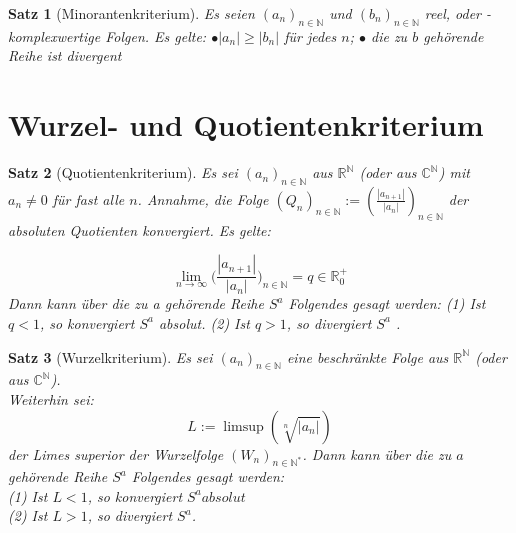 \documentclass[a4paper,12pt]{article}
\newtheorem{theorem}{Satz}[section]
\begin{document}
\begin{theorem}[Minorantenkriterium]
 
Es seien $(a_n)_{n \in \mathbb{N}}$ und $(b_n)_{n \in \mathbb{N}}$ reel, oder -komplexwertige Folgen. Es gelte:
\newline
$\bullet |a_n| \geq |b_n|$ für jedes $n$;
\newline
$\bullet$ die zu $b$ gehörende Reihe ist divergent
 
\end{theorem}
\newpage
\section{Wurzel- und Quotientenkriterium}
\begin{theorem}[Quotientenkriterium]
Es sei $(a_n)_{n \in \mathbb{N}}$ aus $\mathbb{R}^{\mathbb{N}}$ (oder aus $\mathbb{C}^{\mathbb{N}}$) mit $a_n \neq 0$ für fast alle $n$. Annahme, die Folge
$(Q_n)_{n \in \mathbb{N}} := (\frac{|a_{n+1}|}{|a_n|})_{n \in \mathbb{N}}$
der absoluten Quotienten konvergiert. Es gelte:

$$
\lim_{n \to \infty}\bigg(\frac{|a_{n+1}|}{|a_n|}\bigg)_{n \in \mathbb{N}} = q \in \mathbb{R}^{+}_{0} 
$$
Dann kann über die zu a gehörende Reihe $S^a$ Folgendes gesagt werden:
\newline
(1) Ist $q < 1$, so konvergiert $S^a$ absolut.
\newline
(2) Ist $q > 1$, so divergiert $S^a$ .
\end{theorem}

\begin{theorem}[Wurzelkriterium]

Es sei $(a_n)_{n \in \mathbb{N}}$ eine beschränkte Folge aus $\mathbb{R}^{\mathbb{N}}$ (oder aus $\mathbb{C}^{\mathbb{N}}$).
\\
Weiterhin sei:
$$
L := \limsup (\sqrt[n]{|a_n|})
$$
der Limes superior der Wurzelfolge $(W_n)_{n \in \mathbb{N}^*}$. Dann kann über die zu $a$ gehörende Reihe $S^a$ Folgendes gesagt werden:
\\
(1) Ist $L < 1$, so konvergiert $S^a absolut$
\\
(2) Ist $L > 1$, so divergiert $S^a$.

\end{theorem}
\end{document}
